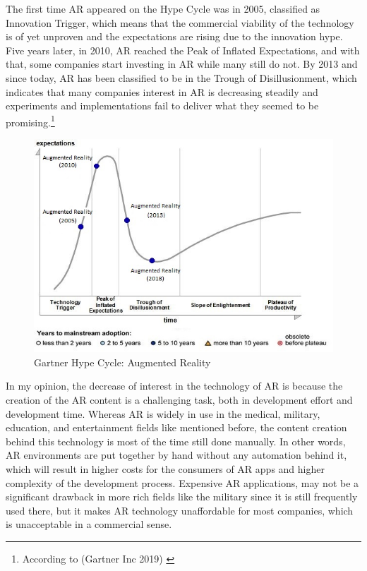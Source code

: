 \documentclass[12pt,a4paper,oneside,american,parskip=half]{article}
\begin{document}
\begin{justify}
\begin{normalsize}
\newline
The first time AR appeared on the Hype Cycle was in 2005, classified as Innovation Trigger, which means that the commercial viability of the technology is of yet unproven and the expectations are rising due to the innovation hype. Five years later, in 2010, AR reached the Peak of Inflated Expectations, and with that, some companies start investing in AR while many still do not.
By 2013 and since today, AR has been classified to be in the Trough of Disillusionment, which indicates that many companies interest in AR is decreasing steadily and experiments and implementations fail to deliver what they seemed to be promising.\footnote{According to (Gartner Inc 2019) \cite{gartner01}}
\begin{figure}[h!]
\centering
\includegraphics[width=\textwidth]{cycle.jpg}
\caption{Gartner Hype Cycle: Augmented Reality \cite{gartner02}}
\end{figure}
\newline
In my opinion, the decrease of interest in the technology of AR is because the creation of the AR content is a challenging task, both in development effort and development time.
\newline
Whereas AR is widely in use in the medical, military, education, and entertainment fields like mentioned before, the content creation behind this technology is most of the time still done manually. In other words, AR environments are put together by hand without any automation behind it, which will result in higher costs for the consumers of AR apps and higher complexity of the development process. Expensive AR applications, may not be a significant drawback in more rich fields like the military since it is still frequently used there, but it makes AR technology unaffordable for most companies, which is unacceptable in a commercial sense.

\end{normalsize}
\end{justify}
\end{document}
